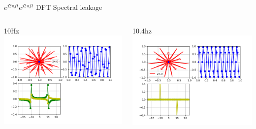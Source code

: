 \begin{frame}{$e^{j2\pi ft}$}{$e^{j2\pi ft}$ DFT Spectral leakage}
   \handsonicon
   \begin{columns}[c]
      \begin{column}{.5\textwidth}
         10Hz
         \centering\includegraphics[width=1.0\textwidth]{3_clase/desparramo1}
      \end{column}
      \begin{column}{.5\textwidth}
         10.4hz
         \centering\includegraphics[width=1.0\textwidth]{3_clase/desparramo2}
      \end{column}
   \end{columns}
   \vfill
\end{frame}
